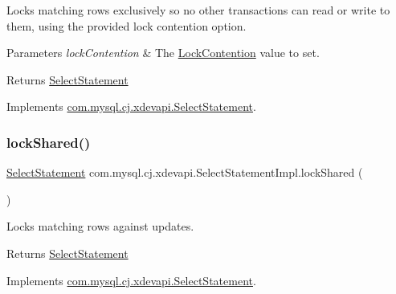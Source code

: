 Locks matching rows exclusively so no other transactions can read or write to them, using the provided lock contention option.


\begin{DoxyParams}{Parameters}
{\em lock\+Contention} & The \mbox{\hyperlink{}{Lock\+Contention}} value to set. \\
\hline
\end{DoxyParams}
\begin{DoxyReturn}{Returns}
\mbox{\hyperlink{interfacecom_1_1mysql_1_1cj_1_1xdevapi_1_1_select_statement}{Select\+Statement}} 
\end{DoxyReturn}


Implements \mbox{\hyperlink{interfacecom_1_1mysql_1_1cj_1_1xdevapi_1_1_select_statement_a993dc3e6fa92a41a1ce2cb1aff9e7c4a}{com.\+mysql.\+cj.\+xdevapi.\+Select\+Statement}}.

\mbox{\label{classcom_1_1mysql_1_1cj_1_1xdevapi_1_1_select_statement_impl_a4c2746728bcf0ed59e1604d57f94f8b2}} 
\subsubsection{\texorpdfstring{lock\+Shared()}{lockShared()}\hspace{0.1cm}{\footnotesize\ttfamily [1/2]}}
{\footnotesize\ttfamily \mbox{\hyperlink{interfacecom_1_1mysql_1_1cj_1_1xdevapi_1_1_select_statement}{Select\+Statement}} com.\+mysql.\+cj.\+xdevapi.\+Select\+Statement\+Impl.\+lock\+Shared (\begin{DoxyParamCaption}{ }\end{DoxyParamCaption})}

Locks matching rows against updates.

\begin{DoxyReturn}{Returns}
\mbox{\hyperlink{interfacecom_1_1mysql_1_1cj_1_1xdevapi_1_1_select_statement}{Select\+Statement}} 
\end{DoxyReturn}


Implements \mbox{\hyperlink{interfacecom_1_1mysql_1_1cj_1_1xdevapi_1_1_select_statement_aeee3b8b28d07cd0609e01164fda0bfd3}{com.\+mysql.\+cj.\+xdevapi.\+Select\+Statement}}.

